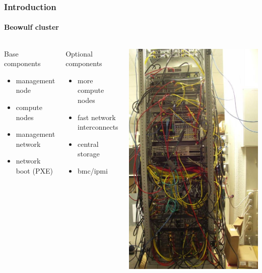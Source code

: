 \documentclass[aspectratio=169]{beamer}
\begin{document}
\begin{frame}[fragile]
\frametitle{Introduction}
\framesubtitle{Beowulf cluster}
\begin{columns}
\begin{block}{Base components}
\begin{itemize}
  \item management node
  \item compute nodes
  \item management network
  \item network boot (PXE)
\end{itemize}
\end{block}
\begin{block}{Optional components}
\begin{itemize}
  \item more compute nodes
  \item fast network interconnects 
  \item central storage
  \item bmc/ipmi
\end{itemize}
\end{block}
  \includegraphics[width=.6\linewidth]{Transtec-056}
\end{columns}
\end{frame}
\end{document}
